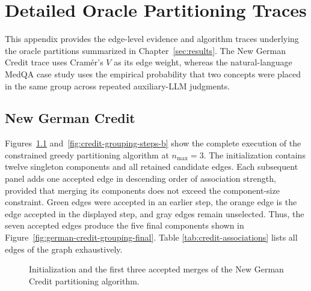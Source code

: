 \chapter{Detailed Oracle Partitioning Traces}
\label{app:oracle-partition-details}

This appendix provides the edge-level evidence and algorithm traces underlying the
oracle partitions summarized in Chapter~\ref{sec:results}. The New German Credit
trace uses Cram\'er's $V$ as its edge weight, whereas the natural-language MedQA
case study uses the empirical probability that two concepts were placed in the same
group across repeated auxiliary-LLM judgments.

\section{New German Credit}
\label{app:credit-partition-trace}

Figures~\ref{fig:credit-grouping-steps-a} and~\ref{fig:credit-grouping-steps-b}
show the complete execution of the constrained greedy partitioning algorithm at
$n_{\max}=3$. The initialization contains twelve singleton components and all
retained candidate edges. Each subsequent panel adds one accepted edge in descending
order of association strength, provided that merging its components does not exceed
the component-size constraint. Green edges were accepted in an earlier step, the
orange edge is the edge accepted in the displayed step, and gray edges remain
unselected. Thus, the seven accepted edges produce the five final components shown
in Figure~\ref{fig:german-credit-grouping-final}. Table \ref{tab:credit-associations} lists all edges of the graph exhaustively.



\begin{figure}[p]
  \centering
  \begin{minipage}[t]{0.49\textwidth}\centering
  \end{minipage}\hfill
  \begin{minipage}[t]{0.49\textwidth}\centering
  \end{minipage}

  \vspace{1em}
  \begin{minipage}[t]{0.49\textwidth}\centering
  \end{minipage}\hfill
  \begin{minipage}[t]{0.49\textwidth}\centering
  \end{minipage}
  \caption{Initialization and the first three accepted merges of the New German Credit partitioning algorithm.}
  \label{fig:credit-grouping-steps-a}
\end{figure}

